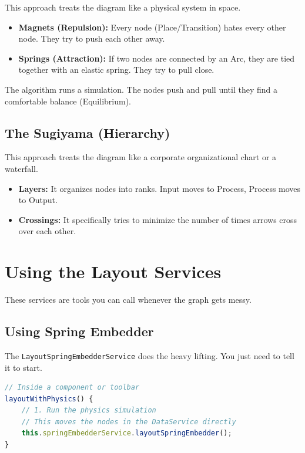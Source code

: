 \documentclass[a4paper,11pt,oneside]{report}
\begin{document}
This approach treats the diagram like a physical system in space.
\begin{itemize}
    \item \textbf{Magnets (Repulsion):} Every node (Place/Transition) hates every other node. They try to push each other away.
    \item \textbf{Springs (Attraction):} If two nodes are connected by an Arc, they are tied together with an elastic spring. They try to pull close.
\end{itemize}

The algorithm runs a simulation. The nodes push and pull until they find a comfortable balance (Equilibrium).

\subsection{The Sugiyama (Hierarchy)}

This approach treats the diagram like a corporate organizational chart or a waterfall.
\begin{itemize}
    \item \textbf{Layers:} It organizes nodes into ranks. Input moves to Process, Process moves to Output.
    \item \textbf{Crossings:} It specifically tries to minimize the number of times arrows cross over each other.
\end{itemize}

\section{Using the Layout Services}

These services are tools you can call whenever the graph gets messy.

\subsection{Using Spring Embedder}

The \texttt{LayoutSpringEmbedderService} does the heavy lifting. You just need to tell it to start.

\begin{lstlisting}[language=TypeScript]
// Inside a component or toolbar
layoutWithPhysics() {
    // 1. Run the physics simulation
    // This moves the nodes in the DataService directly
    this.springEmbedderService.layoutSpringEmbedder();
}
\end{lstlisting}
\end{document}
